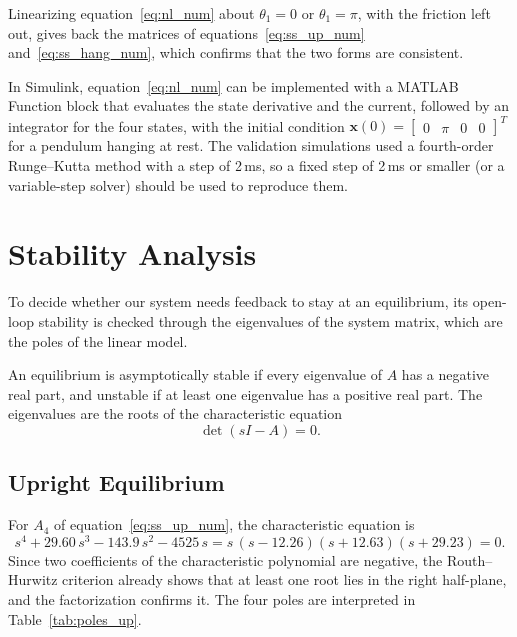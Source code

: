 \documentclass[a4paper,11pt]{article}
\begin{document}
Linearizing equation~\ref{eq:nl_num} about $\theta_1 = 0$ or $\theta_1 = \pi$, with the friction left out, gives back the matrices of equations~\ref{eq:ss_up_num} and~\ref{eq:ss_hang_num}, which confirms that the two forms are consistent.

In Simulink, equation~\ref{eq:nl_num} can be implemented with a MATLAB Function block that evaluates the state derivative and the current, followed by an integrator for the four states, with the initial condition $\mathbf{x}(0) = \begin{bmatrix} 0 & \pi & 0 & 0 \end{bmatrix}^T$ for a pendulum hanging at rest. The validation simulations used a fourth-order Runge--Kutta method with a step of 2\,ms, so a fixed step of 2\,ms or smaller (or a variable-step solver) should be used to reproduce them.

\section{Stability Analysis}
\label{sec:stability}
To decide whether our system needs feedback to stay at an equilibrium, its open-loop stability is checked through the eigenvalues of the system matrix, which are the poles of the linear model.

An equilibrium is asymptotically stable if every eigenvalue of $A$ has a negative real part, and unstable if at least one eigenvalue has a positive real part. The eigenvalues are the roots of the characteristic equation
\begin{equation}
  \det\left(sI - A\right) = 0 .
\end{equation}

\subsection{Upright Equilibrium}
For $A_4$ of equation~\ref{eq:ss_up_num}, the characteristic equation is
\begin{equation}
  s^4 + 29.60\, s^3 - 143.9\, s^2 - 4525\, s = s\,(s - 12.26)(s + 12.63)(s + 29.23) = 0 .
  \label{eq:char_up}
\end{equation}
Since two coefficients of the characteristic polynomial are negative, the Routh--Hurwitz criterion already shows that at least one root lies in the right half-plane, and the factorization confirms it. The four poles are interpreted in Table~\ref{tab:poles_up}.
\end{document}

